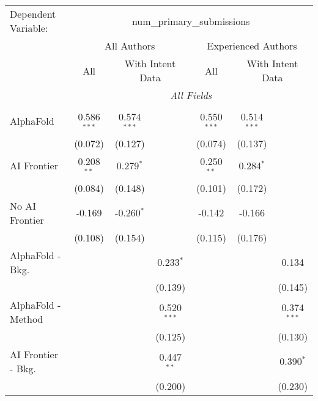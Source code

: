 \begingroup
\centering
\begin{tabular}{lcccccc}
   \tabularnewline \midrule \midrule
   Dependent Variable: & \multicolumn{6}{c}{num\_primary\_submissions}\\
 & \multicolumn{3}{c}{All Authors} & \multicolumn{3}{c}{Experienced Authors} \\
\cmidrule(lr){2-4} \cmidrule(lr){5-7}
 & \multicolumn{1}{c}{All} & \multicolumn{2}{c}{With Intent Data} & \multicolumn{1}{c}{All} & \multicolumn{2}{c}{With Intent Data} \\
\cmidrule(lr){2-2} \cmidrule(lr){3-4} \cmidrule(lr){5-5} \cmidrule(lr){6-7}
 & \multicolumn{6}{c}{\textit{All Fields}} \\ \\
   AlphaFold               & 0.586$^{***}$ & 0.574$^{***}$ &               & 0.550$^{***}$ & 0.514$^{***}$ &   \\   
                           & (0.072)       & (0.127)       &               & (0.074)       & (0.137)       &   \\   
   AI Frontier             & 0.208$^{**}$  & 0.279$^{*}$   &               & 0.250$^{**}$  & 0.284$^{*}$   &   \\   
                           & (0.084)       & (0.148)       &               & (0.101)       & (0.172)       &   \\   
   No AI Frontier          & -0.169        & -0.260$^{*}$  &               & -0.142        & -0.166        &   \\   
                           & (0.108)       & (0.154)       &               & (0.115)       & (0.176)       &   \\   
   AlphaFold - Bkg.        &               &               & 0.233$^{*}$   &               &               & 0.134\\   
                           &               &               & (0.139)       &               &               & (0.145)\\   
   AlphaFold - Method      &               &               & 0.520$^{***}$ &               &               & 0.374$^{***}$\\   
                           &               &               & (0.125)       &               &               & (0.130)\\   
   AI Frontier - Bkg.      &               &               & 0.447$^{**}$  &               &               & 0.390$^{*}$\\   
                           &               &               & (0.200)       &               &               & (0.230)\\   

\end{tabular}
